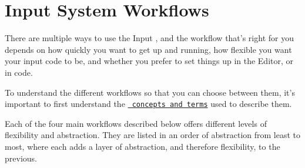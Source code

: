 \chapter{Input System Workflows}
\hypertarget{md__hey_tea_9_2_library_2_package_cache_2com_8unity_8inputsystem_0d1_86_83_2_documentation_0i_2_workflows}{}\label{md__hey_tea_9_2_library_2_package_cache_2com_8unity_8inputsystem_0d1_86_83_2_documentation_0i_2_workflows}
\label{md__hey_tea_9_2_library_2_package_cache_2com_8unity_8inputsystem_0d1_86_83_2_documentation_0i_2_workflows_autotoc_md1612}%
%
 There are multiple ways to use the Input , and the workflow that’s right for you depends on how quickly you want to get up and running, how flexible you want your input code to be, and whether you prefer to set things up in the  Editor, or in code.

To understand the different workflows so that you can choose between them, it’s important to first understand the \href{Concepts.html}{\texttt{ concepts and terms}} used to describe them.

Each of the four main workflows described below offers different levels of flexibility and abstraction. They are listed in an order of abstraction from least to most, where each adds a layer of abstraction, and therefore flexibility, to the previous.

